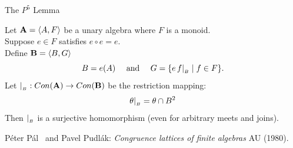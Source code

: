 \begin{frame}[fragile,label=P5Lemma]{The $P^5$ Lemma}
\begin{lemma}
 Let  $\mathbf{A} = \langle A, F\rangle$ be  a  unary  algebra  where  $F$  is  a  monoid.\\[5pt]
 Suppose $e \in F$ satisfies $e\circ e = e$.\\[5pt]
 Define  $\mathbf{B} = \langle B, G\rangle$
 \[
 B=e(A) \quad \text{ and } \quad  
 G = \{e\,f|_{_B} \mid f\in F\}.
 \]
 Let $|_{_B} :  Con (\mathbf{A})\rightarrow Con (\mathbf{B})$  be the restriction mapping:
\[
\theta |_{_B} = \theta \cap B^2
\]
Then  $|_{_B}$  is  a  surjective  homomorphism  
(even  for  arbitrary meets  and  joins). 
\end{lemma}

\vskip1cm

{\small P{\'e}ter P{\'a}l \Palfy\ and Pavel Pudl{\'a}k: {\it Congruence lattices of finite algebras} AU (1980).}

\end{frame}



